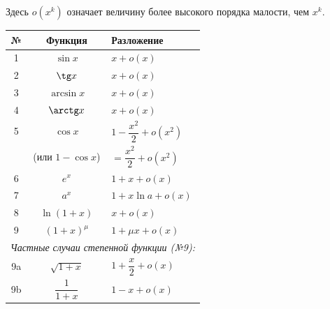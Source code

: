 Здесь $o(x^k)$ означает величину более высокого порядка малости, чем $x^k$.

\begin{tcolorbox}[title=Основные разложения (формулы Маклорена с остатком Пеано)]
\renewcommand{\arraystretch}{1.8}
\begin{tabular}{|c|c|l|}
	\hline
	\textbf{№} & \textbf{Функция} & \textbf{Разложение} \\
	\hline
	1 & $\sin x$ & $x + o(x)$ \\
	\hline
	2 & $\tg x$ & $x + o(x)$ \\
	\hline
	3 & $\arcsin x$ & $x + o(x)$ \\
	\hline
	4 & $\arctg x$ & $x + o(x)$ \\
	\hline
	5 & $\cos x$ & $1 - \dfrac{x^2}{2} + o(x^2)$ \\
	  & \small{(или $1 - \cos x$)} & \small{$= \dfrac{x^2}{2} + o(x^2)$} \\
	\hline
	6 & $e^x$ & $1 + x + o(x)$ \\
	\hline
	7 & $a^x$ & $1 + x \ln a + o(x)$ \\
	\hline
	8 & $\ln(1 + x)$ & $x + o(x)$ \\
	\hline
	9 & $(1 + x)^\mu$ & $1 + \mu x + o(x)$ \\
	\hline
	\multicolumn{3}{|c|}{\textit{Частные случаи степенной функции (№9):}} \\
	\hline
	9a & $\sqrt{1+x}$ & $1 + \dfrac{x}{2} + o(x)$ \\
	\hline
	9b & $\dfrac{1}{1+x}$ & $1 - x + o(x)$ \\
	\hline
\end{tabular}
\end{tcolorbox}
